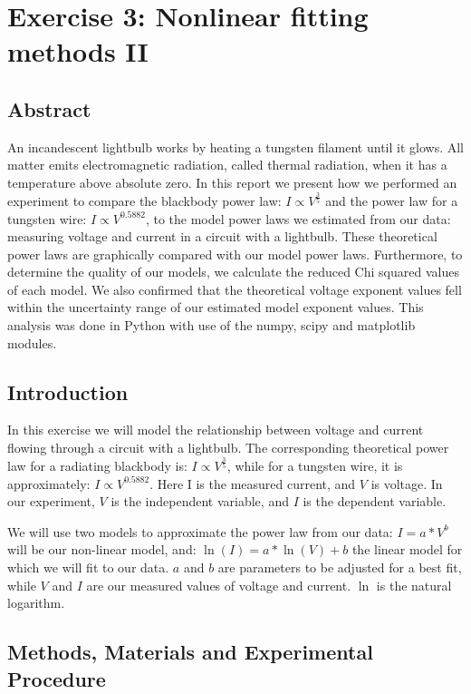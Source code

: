 \documentclass[letterpaper,12pt]{article}
\begin{document}
\pagebreak

\section{Exercise 3:  Nonlinear fitting methods II}

\subsection{Abstract}

An incandescent lightbulb works by heating a tungsten filament until it glows. 
All matter emits electromagnetic radiation, called thermal radiation, 
when it has a temperature above absolute zero. 
In this report we present how we performed an experiment to compare 
the blackbody power law: $I \propto V^{\frac{3}{5}}$ and the power law for a tungsten wire: 
$I \propto V^{0.5882}$, to the model power laws we estimated from our data: 
measuring voltage and current in a circuit with a lightbulb. 
These theoretical power laws are graphically compared with 
our model power laws. Furthermore, to determine the quality of our models, 
we calculate the reduced Chi squared values of each model. We also confirmed 
that the theoretical voltage exponent values fell within the uncertainty range 
of our estimated model exponent values. This analysis was done in Python with use 
of the numpy, scipy and matplotlib modules.

\subsection{Introduction}

In this exercise we will model the relationship between voltage and current flowing 
through a circuit with a lightbulb. The corresponding theoretical power law for a 
radiating blackbody is: $I \propto V^{\frac{3}{5}}$, while for a tungsten wire, it is approximately: 
$I \propto V^{0.5882}$. Here I is the measured current, and $V$ is voltage. In our experiment, 
$V$ is the independent variable, and $I$ is the dependent variable. 

We will use two models to approximate the power law from our data: $I = a*V^b$ 
will be our non-linear model, and: $\ln(I) = a*\ln(V)+b$ the linear model for which 
we will fit to our data. $a$ and $b$ are parameters to be adjusted for a best fit, 
while $V$ and $I$ are our measured values of voltage and current. $\ln$ is the natural logarithm.

\subsection{Methods, Materials and Experimental Procedure}
\end{document}
